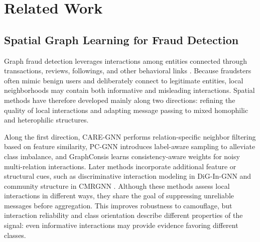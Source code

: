 \documentclass[10pt,journal]{IEEEtran}
\begin{document}
\section{Related Work}
\label{sec:related_work}

\subsection{Spatial Graph Learning for Fraud Detection}

Graph fraud detection leverages interactions among entities connected through transactions, reviews, followings, and other behavioral links \cite{cheng2025fraudreview}. Because fraudsters often mimic benign users and deliberately connect to legitimate entities, local neighborhoods may contain both informative and misleading interactions. Spatial methods have therefore developed mainly along two directions: refining the quality of local interactions and adapting message passing to mixed homophilic and heterophilic structures.

Along the first direction, CARE-GNN \cite{dou2020caregnn} performs relation-specific neighbor filtering based on feature similarity, PC-GNN \cite{liu2021pcgnn} introduces label-aware sampling to alleviate class imbalance, and GraphConsis \cite{liu2020graphconsis} learns consistency-aware weights for noisy multi-relation interactions. Later methods incorporate additional feature or structural cues, such as discriminative interaction modeling in DiG-In-GNN \cite{zhang2024digingnn} and community structure in CMRGNN \cite{han2025cmrgnn}. Although these methods assess local interactions in different ways, they share the goal of suppressing unreliable messages before aggregation. This improves robustness to camouflage, but interaction reliability and class orientation describe different properties of the signal: even informative interactions may provide evidence favoring different classes.
\end{document}
